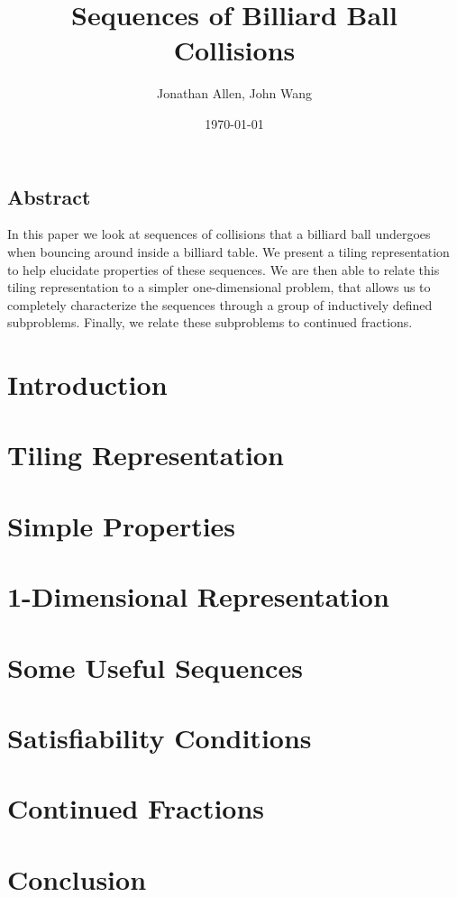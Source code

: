 \documentclass[12pt]{amsart}   %
\begin{document}
\graphicspath{ {figures/} }

\title[Billiards]{Sequences of Billiard Ball Collisions}

\author{Jonathan Allen, John Wang}
\date{\today}

\maketitle

\subsection*{Abstract}

In this paper we look at sequences of collisions that a billiard ball undergoes when bouncing around inside a billiard table. We present a tiling representation to help elucidate properties of these sequences. We are then able to relate this tiling representation to a simpler one-dimensional problem, that allows us to completely characterize the sequences through a group of inductively defined subproblems. Finally, we relate these subproblems to continued fractions.

\section{Introduction}


\section{Tiling Representation}


\section{Simple Properties}


\section{1-Dimensional Representation}


\section{Some Useful Sequences}


\section{Satisfiability Conditions}


\section{Continued Fractions}


\section{Conclusion}



\end{document}
